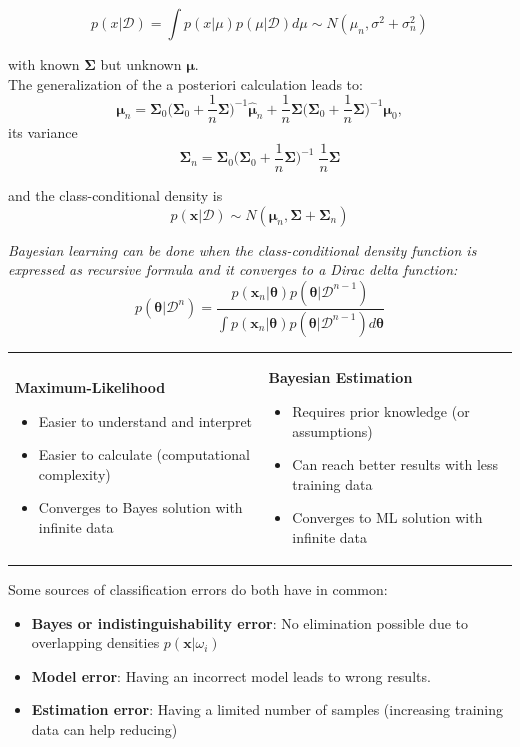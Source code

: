   $$p(x|\mathcal{D}) = \int p(x|\mu) p(\mu|\mathcal{D}) d\mu \sim N(\mu_n, \sigma^2+\sigma_n^2)$$ 
    
  with known $\bm\Sigma$ but unknown $\bm{\mu}$.\\
  The generalization of the a posteriori calculation leads to:
  $$\bm{\mu}_n = \bm{\Sigma}_0 \Big(\bm{\Sigma}_0 + \frac1n \bm{\Sigma}\Big)^{-1}\bm{\hat{\mu}}_n +
    \frac1n \bm{\Sigma} \Big(\bm{\Sigma}_0 + \frac1n \bm{\Sigma}\Big)^{-1} \bm{\mu}_0,$$
  its variance
  $$\bm{\Sigma}_n = \bm{\Sigma}_0 \Big( \bm{\Sigma}_0 + 
    \frac1n \bm{\Sigma}\Big)^{-1}\; \frac1n{\bm{\Sigma}}$$
  
  and the class-conditional density is
  $$p(\bm{x}|\mathcal{D}) \sim N(\bm{\mu}_n, \bm{\Sigma} + \bm{\Sigma}_n)$$
  
  \em Bayesian learning \em can be done when the class-conditional density function is expressed 
  as recursive formula and it converges to a Dirac delta function:
  $$p(\bm{\theta} | \mathcal{D}^n) = \frac{p(\bm{x}_n|\bm{\theta}) p(\bm{\theta}| \mathcal{D}^{n-1})}
  {\int p(\bm{x}_n|\bm{\theta}) p(\bm{\theta}|\mathcal{D}^{n-1}) d\bm{\theta}}$$
  
  
  \begin{tabular}{ll}
    \parbox{9cm}{
      \textbf{Maximum-Likelihood}
      \begin{itemize}
        \item Easier to understand and interpret
        \item Easier to calculate (computational complexity)
        \item Converges to Bayes solution with infinite data
      \end{itemize}
    }
    & \parbox{9cm}{
      \textbf{Bayesian Estimation}
      \begin{itemize}
        \item Requires prior knowledge (or assumptions)
        \item Can reach better results with less training data
        \item Converges to ML solution with infinite data
      \end{itemize}
    }
  \end{tabular}
  
  Some sources of classification errors do both have in common:
  \begin{itemize}
    \item \textbf{Bayes or indistinguishability error}: No elimination possible due to overlapping
    densities $p(\bm{x}|\omega_i)$
  	\item \textbf{Model error}: Having an incorrect model leads to wrong results.
  	\item \textbf{Estimation error}: Having a limited number of samples (increasing training data can help reducing)
  \end{itemize}
  
